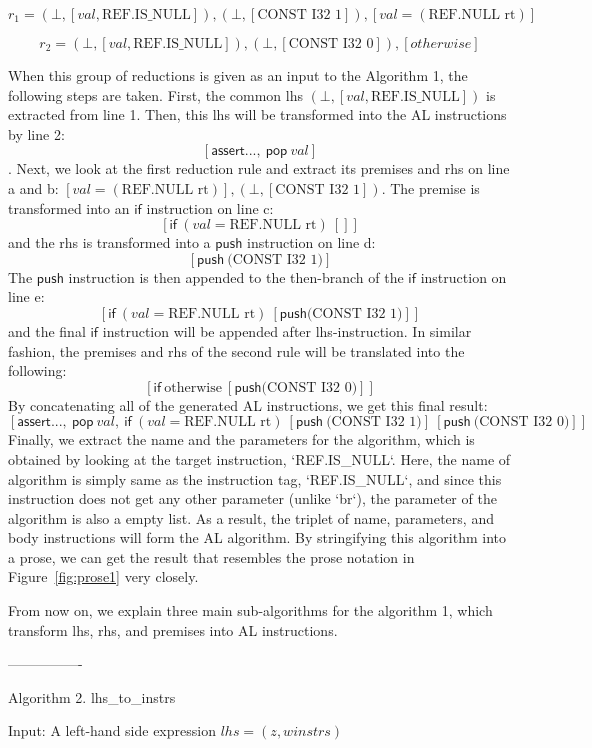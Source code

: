 \[r_1=(\bot, [val, \text{REF.IS\_NULL}]), (\bot, [\text{CONST I32 1}]), [val = (\text{REF.NULL rt})]\]

\[r_2=(\bot, [val, \text{REF.IS\_NULL}]), (\bot, [\text{CONST I32 0}]), [otherwise]\]

When this group of reductions is given as an input to the Algorithm 1, the following steps are taken.
First, the common lhs $(\bot, [val, \text{REF.IS\_NULL}])$ is extracted from line 1.
Then, this lhs will be transformed into the AL instructions by line 2:
\[[\mathsf{assert} ...,~\mathsf{pop}~val]\].
Next, we look at the first reduction rule and extract its premises and rhs on line a and b:
$ [val = (\text{REF.NULL rt})], (\bot, [\text{CONST I32 1}])$.
The premise is transformed into an $\mathsf{if}$ instruction on line c:
\[[\mathsf{if}~(val = \text{REF.NULL rt})~[]]\]
and the rhs is transformed into a $\mathsf{push}$ instruction on line d:
\[[\mathsf{push}~\text{(CONST I32 1)}]\]
The $\mathsf{push}$ instruction is then appended to the then-branch of the $\mathsf{if}$ instruction on line e:
\[[\mathsf{if}~(val = \text{REF.NULL rt})~[\mathsf{push} \text{(CONST I32 1)}]]\]
and the final $\mathsf{if}$ instruction will be appended after lhs-instruction.
In similar fashion, the premises and rhs of the second rule will be translated into the following:
\[[\mathsf{if}~\text{otherwise}~[\mathsf{push} \text{(CONST I32 0)}]]\]
By concatenating all of the generated AL instructions, we get this final result:
\[[
\mathsf{assert} ...,~
\mathsf{pop}~val,~
\mathsf{if}~(val = \text{REF.NULL rt})~[\mathsf{push}~\text{(CONST I32 1)}]~[\mathsf{push}~\text{(CONST I32 0)}]
]\]
Finally, we extract the name and the parameters for the algorithm, which is obtained by looking at
the target instruction, `REF.IS\_NULL`. Here, the name of algorithm is simply same as the instruction tag,
`REF.IS\_NULL`, and since this instruction does not get any other parameter (unlike `br`), the parameter of
the algorithm is also a empty list. As a result, the triplet of name, parameters, and body instructions will form
the AL algorithm.
By stringifying this algorithm into a prose, we can get the result that resembles the prose notation in
Figure~\ref{fig:prose1} very closely.

From now on, we explain three main sub-algorithms for the algorithm 1,
which transform lhs, rhs, and premises into AL instructions.

----------------

Algorithm 2. lhs\_to\_instrs

Input: A left-hand side expression $lhs = (z, winstrs)$


